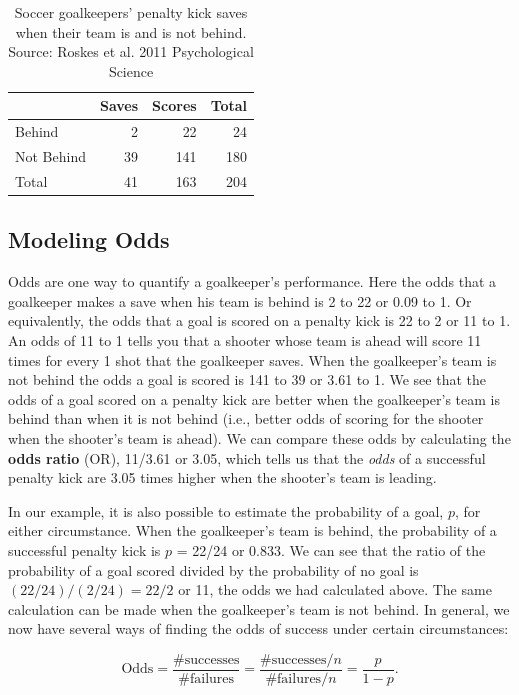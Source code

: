 \documentclass[
]{krantz}
\begin{document}
\begin{table}

\caption{\label{tab:table1chp6}Soccer goalkeepers' penalty kick saves when their team is and is not behind.  Source: Roskes et al. 2011 Psychological Science}
\centering
\begin{tabular}[t]{lrrr}
\toprule
  & Saves & Scores & Total\\
\midrule
Behind & 2 & 22 & 24\\
Not Behind & 39 & 141 & 180\\
Total & 41 & 163 & 204\\
\bottomrule
\end{tabular}
\end{table}

\hypertarget{modeling-odds}{%
\subsection{Modeling Odds}\label{modeling-odds}}

Odds are one way to quantify a goalkeeper's performance. Here the odds that a goalkeeper makes a save when his team is behind is 2 to 22 or 0.09 to 1. Or equivalently, the odds that a goal is scored on a penalty kick is 22 to 2 or 11 to 1. An odds of 11 to 1 tells you that a shooter whose team is ahead will score 11 times for every 1 shot that the goalkeeper saves. When the goalkeeper's team is not behind the odds a goal is scored is 141 to 39 or 3.61 to 1. We see that the odds of a goal scored on a penalty kick are better when the goalkeeper's team is behind than when it is not behind (i.e., better odds of scoring for the shooter when the shooter's team is ahead). We can compare these odds by calculating the \textbf{odds ratio}  (OR), 11/3.61 or 3.05, which tells us that the \emph{odds} of a successful penalty kick are 3.05 times higher when the shooter's team is leading.

In our example, it is also possible to estimate the probability of a goal, \(p\), for either circumstance. When the goalkeeper's team is behind, the probability of a successful penalty kick is \(p\) = 22/24 or 0.833. We can see that the ratio of the probability of a goal scored divided by the probability of no goal is \((22/24)/(2/24)=22/2\) or 11, the odds we had calculated above. The same calculation can be made when the goalkeeper's team is not behind. In general, we now have several ways of finding the odds of success under certain circumstances:

\[\textrm{Odds} = \frac{\# \textrm{successes}}{\# \textrm{failures}}=
\frac{\# \textrm{successes}/n}{\# \textrm{failures}/n}=
\frac{p}{1-p}.\]
\end{document}
